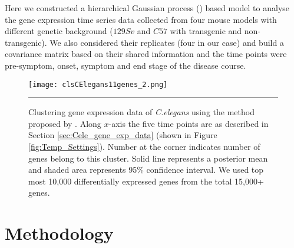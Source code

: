 Here we constructed a hierarchical Gaussian process (\cite{Hensman:2013}) based model to analyse the gene expression time series data collected from four mouse models with different genetic background ($129Sv$ and $C57$ with transgenic and non-transgenic). We also considered their replicates (four in our case) and build a covariance matrix based on their shared information and the time points were pre-symptom, onset, symptom and end stage of the disease course.
\begin{figure}
	\centering
		\texttt{[image: clsCElegans11genes\_2.png]}
		\rule{35em}{0.5pt}
	\caption[Clustering Gene Expression data of \textit{C.elegans}]
		{Clustering gene expression data of \textit{C.elegans} using the method proposed by \cite{Hensman:2013}. Along $x$-axis the five time points are as described in Section \ref{sec:Cele_gene_exp_data} (shown in Figure \ref{fig:Temp_Settings}). Number at the corner indicates number of genes belong to this cluster. Solid line represents a posterior mean and shaded area represents 95\% confidence interval. We used top most 10,000 differentially expressed genes from the total 15,000+ genes.} %
	\label{fig:clsCelegans}
\end{figure}



\section{Methodology}

